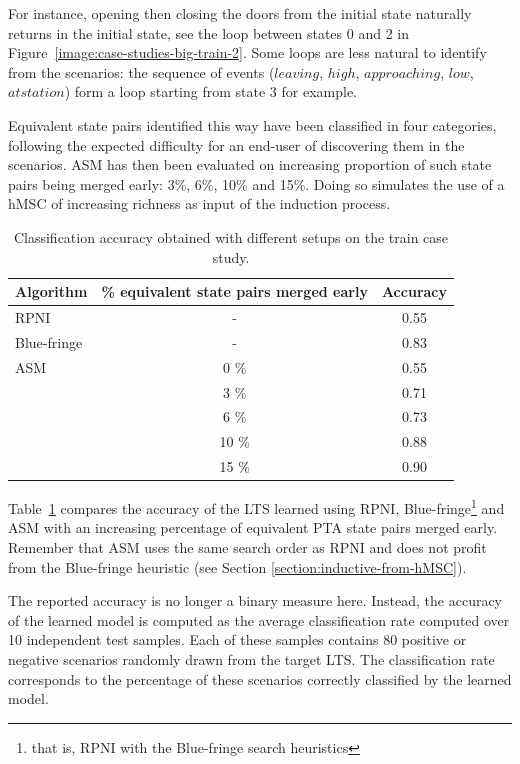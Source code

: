 For instance, opening then closing the doors from the initial state naturally returns in the initial state, see the loop between states 0 and 2 in Figure~\ref{image:case-studies-big-train-2}. Some loops are less natural to identify from the scenarios: the sequence of events ($leaving$, $high$, $approaching$, $low$, $at station$) form a loop starting from state 3 for example. 

Equivalent state pairs identified this way have been classified in four categories, following the expected difficulty for an end-user of discovering them in the scenarios. ASM has then been evaluated on increasing proportion of such state pairs being merged early: 3\%, 6\%, 10\% and 15\%. Doing so simulates the use of a hMSC of increasing richness as input of the induction process. 

\begin{table}[H]
\centering
\small
\begin{tabular}{|l|c|c|}\hline
Algorithm& \% equivalent state pairs merged early &Accuracy\\\hline\hline
RPNI      & -    & 0.55\\\hline
Blue-fringe& -   & 0.83\\\hline
ASM       & 0 \%  & 0.55\\\cline{2-3}
          & 3 \%  & 0.71\\\cline{2-3}
          & 6 \%  & 0.73\\\cline{2-3}
          & 10 \% & 0.88\\\cline{2-3}
          & 15 \% & 0.90\\\hline
\end{tabular}
\caption{Classification accuracy obtained with different setups on the train case study.\label{RE:experesults}}
\end{table} 

Table~\ref{RE:experesults} compares the accuracy of the LTS learned using RPNI, Blue-fringe\footnote{that is, RPNI with the Blue-fringe search heuristics} and ASM with an increasing percentage of equivalent PTA state pairs merged early. Remember that ASM uses the same search order as RPNI and does not profit from the Blue-fringe heuristic (see Section \ref{section:inductive-from-hMSC}).

The reported accuracy is no longer a binary measure here. Instead, the accuracy of the learned model is computed as the average classification rate computed over 10 independent test samples. Each of these samples contains 80 positive or negative scenarios randomly drawn from the target LTS. The classification rate corresponds to the percentage of these scenarios correctly classified by the learned model. 

